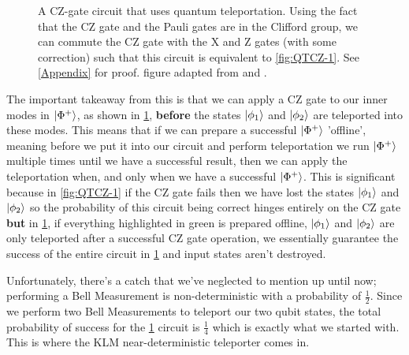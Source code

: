 \begin{figure}[H]
\begin{tikzpicture}[x=0.75pt,y=0.75pt,yscale=-1,xscale=1]
\end{tikzpicture}


 \caption{A CZ-gate circuit that uses quantum teleportation. Using the fact that the CZ gate and the Pauli gates are in the Clifford group, we can commute the CZ gate with the X and Z gates (with some correction) such that this circuit is equivalent to \cref{fig:QTCZ-1}. See \ref{Appendix} for proof. figure adapted from \cite{Kok:2005jip} and \cite{KnillE2001Asfe}. }
    \label{fig:QTCZ-2}
\end{figure}

The important takeaway from this is that we can apply a CZ gate to our inner modes in $\ket{\Phi^+}$, as shown in \cref{fig:QTCZ-2}, \textbf{before} the states $\ket{\phi_1}$ and $\ket{\phi_2}$ are teleported into these modes. This means that if we can prepare a successful $\ket{\Phi^+}$ 'offline', meaning before we put it into our circuit and perform teleportation we run $\ket{\Phi^+}$ multiple times until we have a successful result, then we can apply the teleportation when, and only when we have a successful $\ket{\Phi^+}$. This is significant because in \cref{fig:QTCZ-1} if the CZ gate fails then we have lost the states $\ket{\phi_1}$ and $\ket{\phi_2}$ so the probability of this circuit being correct hinges entirely on the CZ gate \textbf{but} in \cref{fig:QTCZ-2}, if everything highlighted in green is prepared offline, $\ket{\phi_1}$ and $\ket{\phi_2}$ are only teleported after a successful CZ gate operation, we essentially guarantee the success of the entire circuit in \cref{fig:QTCZ-2} and input states aren't destroyed\cite{GottesmanDaniel1999QTia}.
\par
Unfortunately, there's a catch that we've neglected to mention up until now; performing a Bell Measurement is non-deterministic with a probability of $\frac{1}{2}$. Since we perform two Bell Measurements to teleport our two qubit states, the total probability of success for the \cref{fig:QTCZ-2} circuit is $\frac{1}{4}$ which is exactly what we started with. This is where the KLM near-deterministic teleporter comes in. 

